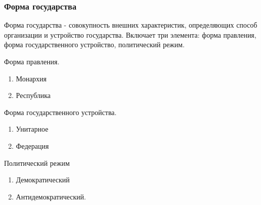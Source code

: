 \documentclass{article}
\begin{document}
\subsubsection{Форма государства}
Форма государства - совокупность внешних характеристик, определяющих способ организации и устройство
государства. Включает три элемента: форма правления, форма государственного устройство, политический режим.

Форма правления.
\begin{enumerate}
    \item Монархия
    \item Республика
\end{enumerate}

Форма государственного устройства.
\begin{enumerate}
    \item Унитарное
    \item Федерация
\end{enumerate}

Политический режим
\begin{enumerate}
    \item Демократический
    \item Антидемократический.
\end{enumerate}
\end{document}
